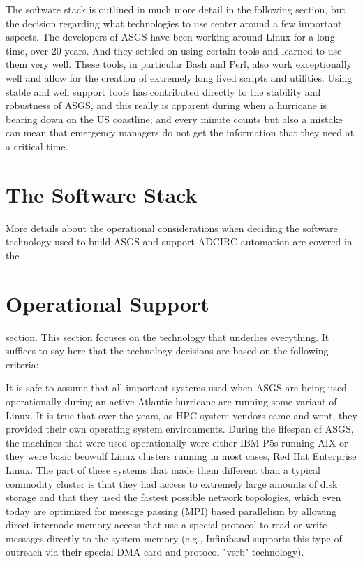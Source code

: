\documentclass{article}
\begin{document}
The software stack is outlined in much more detail in the following section, but
the decision regarding what technologies to use center around a few important
aspects. The developers of ASGS have been working around Linux for a long time,
over 20 years. And they settled on using certain tools and learned to use them
very well. These tools, in particular Bash and Perl, also work exceptionally
well and allow for the creation of extremely long lived scripts and utilities.
Using stable and well support tools has contributed directly to the stability
and robustness of ASGS, and this really is apparent during when a hurricane is
bearing down on the US coastline; and every minute counts but also a mistake can
mean that emergency managers do not get the information that they need at a
critical time.

\section{The Software Stack}

More details about the operational considerations when deciding the software
technology used to build ASGS and support ADCIRC automation are covered in the
\section{Operational Support} section. This section focuses on the technology
that underlies everything. It suffices to say here that the technology decisions
are based on the following criteria:

It is safe to assume that all important systems used when ASGS are being used
operationally during an active Atlantic hurricane are running some variant of
Linux. It is true that over the years, as HPC system vendors came and went, they
provided their own operating system environments. During the lifespan of ASGS,
the machines that were used operationally were either IBM P5s running AIX or
they were basic beowulf Linux clusters running in most cases, Red Hat Enterprise
Linux. The part of these systems that made them different than a typical
commodity cluster is that they had access to extremely large amounts of disk
storage and that they used the fastest possible network topologies, which even
today are optimized for message passing (MPI) based parallelism by allowing
direct internode memory access that use a special protocol to read or write
messages directly to the system memory (e.g., Infiniband supports this type of
outreach via their special DMA card and protocol "verb" technology).
\end{document}
